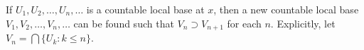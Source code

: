 If $U_1, U_2, \ldots, U_n, \ldots$ is a countable local base at $x$, then a new countable local base $V_1, V_2, \ldots, V_n, \ldots$ can be found such that $V_n \supset V_{n+1}$ for each $n$. Explicitly, let $V_n = \bigcap \{U_k : k \leq n\}$.
